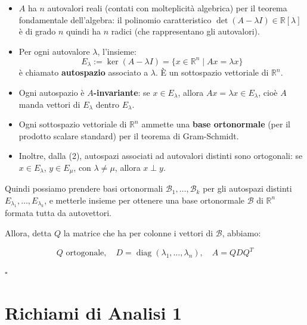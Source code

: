 \documentclass[12pt,a4paper]{article}
\begin{document}
\begin{itemize}
  \item \( A \) ha \( n \) autovalori reali (contati con molteplicità algebrica) per il teorema fondamentale dell'algebra: il polinomio caratteristico \( \det(A - \lambda I) \in \mathbb{R}[\lambda] \) è di grado $n$ quindi ha \( n \) radici (che rappresentano gli autovalori).
  
  \item Per ogni autovalore \( \lambda \), l'insieme:
  \[
  E_\lambda := \ker(A - \lambda I) = \{x \in \mathbb{R}^n \mid Ax = \lambda x\}
  \]
  è chiamato \textbf{autospazio} associato a \( \lambda \). È un sottospazio vettoriale di \( \mathbb{R}^n \).

  \item Ogni autospazio è \textbf{\( A \)-invariante}: se \( x \in E_\lambda \), allora \( Ax = \lambda x \in E_\lambda \), cioè \( A \) manda vettori di \( E_\lambda \) dentro \( E_\lambda \).

  \item Ogni sottospazio vettoriale di \( \mathbb{R}^n \) ammette una \textbf{base ortonormale} (per il prodotto scalare standard) per il teorema di Gram-Schmidt.

  \item Inoltre, dalla (2), autospazi associati ad autovalori distinti sono ortogonali: se \( x \in E_\lambda \), \( y \in E_\mu \), con \( \lambda \ne \mu \), allora \( x \perp y \).
\end{itemize}

\noindent Quindi possiamo prendere basi ortonormali \( \mathcal{B}_1, \dots, \mathcal{B}_k \) per gli autospazi distinti \( E_{\lambda_1}, \dots, E_{\lambda_k} \), e metterle insieme per ottenere una base ortonormale \( \mathcal{B} \) di \( \mathbb{R}^n \) formata tutta da autovettori.

Allora, detta \( Q \) la matrice che ha per colonne i vettori di \( \mathcal{B} \), abbiamo:

\[
Q \text{ ortogonale}, \quad D = \operatorname{diag}(\lambda_1, \dots, \lambda_n), \quad A = Q D Q^T
\]

\hfill $\square$













\newpage

\section*{Richiami di Analisi 1}
\end{document}
